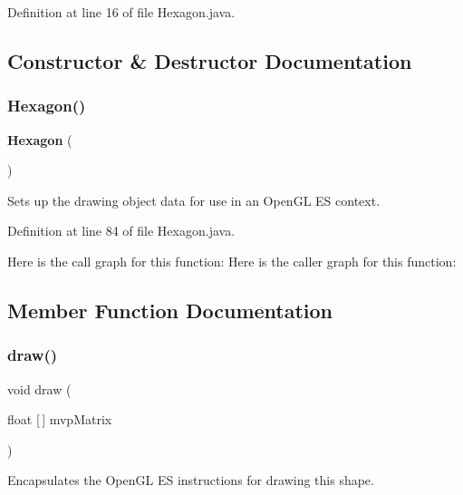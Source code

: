 Definition at line 16 of file Hexagon.\+java.



\subsection{Constructor \& Destructor Documentation}
\mbox{\label{classru_1_1litun_1_1unitingtwist_1_1_hexagon_aadc1f20d3bb3b975b0e03c519a7f8917}} 
\subsubsection{Hexagon()}
{\footnotesize\ttfamily \textbf{ Hexagon} (\begin{DoxyParamCaption}{ }\end{DoxyParamCaption})}



Sets up the drawing object data for use in an Open\+GL ES context. 



Definition at line 84 of file Hexagon.\+java.

Here is the call graph for this function\+:
Here is the caller graph for this function\+:


\subsection{Member Function Documentation}
\mbox{\label{classru_1_1litun_1_1unitingtwist_1_1_hexagon_ace8a0d2a4e41b6d83897d48fd91a7ab3}} 
\subsubsection{draw()}
{\footnotesize\ttfamily void draw (\begin{DoxyParamCaption}\item[{float [$\,$]}]{mvp\+Matrix }\end{DoxyParamCaption})}



Encapsulates the Open\+GL ES instructions for drawing this shape. 


